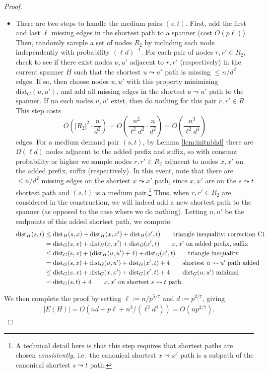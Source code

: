 \documentclass{article}
\newcommand{\dist}{\text{dist}}
\begin{document}
\begin{proof}
\begin{itemize}
\item There are two steps to handle the medium pairs $(s, t)$.
First, add the first and last $\ell$ missing edges in the shortest path to a spanner (cost $O(p \ell)$).
Then, randomly sample a set of nodes $R_2$ by including each node independently with probability $(\ell d)^{-1}$.
For each pair of nodes $r, r' \in R_2$, check to see if there exist nodes $u, u'$ adjacent to $r, r'$ (respectively) in the current spanner $H$ such that the shortest $u \leadsto u'$ path is missing $\le n/d^2$ edges.
If so, then choose nodes $u, u'$ with this property minimizing $\dist_G(u, u')$, and add all missing edges in the shortest $u \leadsto u'$ path to the spanner.
If no such nodes $u, u'$ exist, then do nothing for this pair $r, r' \in R$.
This step costs
$$O\left( |R_2|^2 \cdot \frac{n}{d^2} \right) = O\left( \frac{n^2}{\ell^2 d^2} \cdot \frac{n}{d^2} \right) = O\left( \frac{n^3}{\ell^2 d^4} \right)$$
edges.
For a medium demand pair $(s, t)$, by Lemma \ref{lem:initnbhd} there are $\Omega(\ell d)$ nodes adjacent to the added prefix and suffix, so with constant probability or higher we sample nodes $r, r' \in R_2$ adjacent to nodes $x, x'$ on the added prefix, suffix (respectively).
In this event, note that there are $\le n/d^2$ missing edges on the shortest $x \leadsto x'$ path, since $x, x'$ are on the $s \leadsto t$ shortest path and $(s, t)$ is a medium pair.\footnote{A technical detail here is that this step requires that shortest paths are chosen \emph{consistently}, i.e.\ the canonical shortest $x \leadsto x'$ path is a subpath of the canonical shortest $s \leadsto t$ path.}
Thus, when $r, r' \in R_2$ are considered in the construction, we will indeed add a new shortest path to the spanner (as opposed to the case where we do nothing).
Letting $u, u'$ be the endpoints of this added shortest path, we compute:
\begin{align*}
\dist_H(s, t) &\le \dist_H(s, x) + \dist_H(x, x') + \dist_H(x', t) \tag*{triangle inequality; correction C1}\\
&= \dist_G(s, x) + \dist_H(x, x') + \dist_G(x', t) \tag*{$x, x'$ on added prefix, suffix}\\
&\le \dist_G(s, x) + \left(\dist_H(u, u') + 4\right) + \dist_G(x', t) \tag*{triangle inequality}\\
&= \dist_G(s, x) + \dist_G(u, u') + \dist_G(x', t) + 4 \tag*{shortest $u \leadsto u'$ path added}\\
&\le \dist_G(s, x) + \dist_G(x, x') + \dist_G(x', t) + 4 \tag*{$\dist_G(u, u')$ minimal}\\
&= \dist_G(s, t) + 4 \tag*{$x, x'$ on shortest $s \leadsto t$ path.}
\end{align*}
\end{itemize}
We then complete the proof by setting $\ell := n/p^{5/7}$ and $d := p^{2/7}$, giving
\begin{align*}
|E(H)| = O\left(nd + p\ell + n^3/(\ell^2 d^4) \right) = O\left(np^{2/7}\right). \tag*{\qedhere}
\end{align*}
\end{proof}
\end{document}
